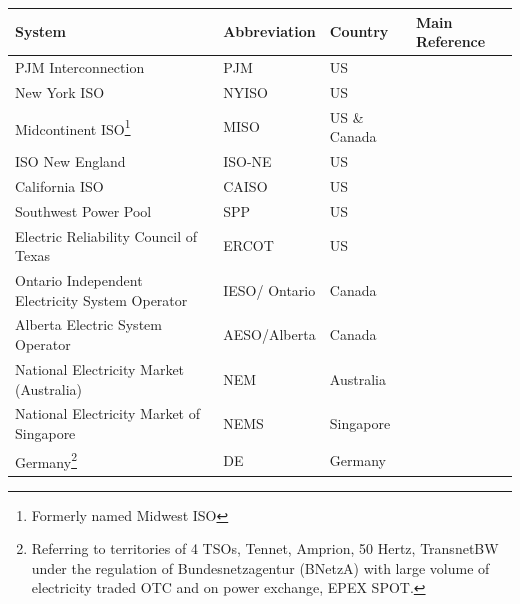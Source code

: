 \begin{table}[h!]
	\small
	\centering
	\begin{tabular}{L{5cm} l l l}
		\hline
		\hline
		\textbf{System} & \textbf{Abbreviation} & \textbf{Country} & \textbf{Main Reference} \\
		\hline
		\hline
		PJM Interconnection & PJM & US & \cite{Rebours2009,Srivastava2011,Cochran2013,EllisonJ.F.TesfatsionL.S.LooseV.W.Byrne2012,Gilstrap2015,Brown2015,Borenstein2015,PJM_web,PJM2017b,PJM2017c}\\
		\hline
		New York ISO & NYISO & US & \cite{Cochran2013,EllisonJ.F.TesfatsionL.S.LooseV.W.Byrne2012,Gilstrap2015,Borenstein2015,NYISO_web}\\
		\hline
		Midcontinent ISO\footnote{Formerly named Midwest ISO}& MISO & US \& Canada& \cite{EllisonJ.F.TesfatsionL.S.LooseV.W.Byrne2012,Gilstrap2015,Borenstein2015,MISO_web}\\
		\hline
		ISO New England & ISO-NE & US & \cite{EllisonJ.F.TesfatsionL.S.LooseV.W.Byrne2012,Gilstrap2015,Borenstein2015,ISO_NE_web}\\
		\hline
		California ISO & CAISO & US& \cite{Rebours2009,EllisonJ.F.TesfatsionL.S.LooseV.W.Byrne2012,Gilstrap2015,Borenstein2015,CAISO_web}\\
		\hline
		Southwest Power Pool & SPP & US & \cite{EllisonJ.F.TesfatsionL.S.LooseV.W.Byrne2012,Gilstrap2015,Borenstein2015,SPP_web}\\
		\hline
		Electric Reliability Council of Texas & ERCOT & US & \cite{Srivastava2011,EllisonJ.F.TesfatsionL.S.LooseV.W.Byrne2012,Brown2015,Gilstrap2015,Borenstein2015,ERCOT_web}\\
		\hline
		Ontario Independent Electricity System Operator& IESO/ Ontario& Canada & \cite{Cochran2013,Brown2015,Ontario_web}\\
		\hline
		Alberta Electric System Operator & AESO/Alberta & Canada &  \cite{Brown2015,Alberta_web}\\
		\hline
		National Electricity Market (Australia) & NEM & Australia & \cite{Srivastava2011,Brown2015,AEMO2010,AEMO2015a}\\
		\hline
		National Electricity Market of Singapore & NEMS & Singapore & \cite{Brown2015} \\
		\hline
		Germany\footnote{Referring to territories of 4 TSOs, Tennet, Amprion, 50 Hertz, TransnetBW under the regulation of Bundesnetzagentur (BNetzA) with large volume of electricity traded OTC and on power exchange, EPEX SPOT. } & DE & Germany & \cite{FrontierEconomics2016,Wartsila2014,ConsentecGmbH2014,Deloitte2015} \\

\end{tabular}
\end{table}
